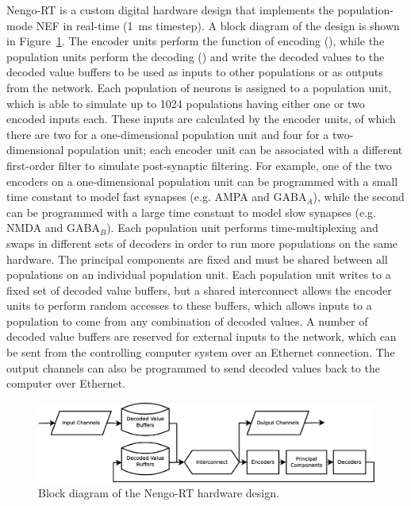 \documentclass[english]{article}
\newcommand{\design}{Nengo-RT}
\begin{document}
\design{} is a custom digital hardware design that implements the population-mode NEF in real-time (1~ms timestep).
A block diagram of the design is shown in Figure~\ref{fig:system}.
The encoder units perform the function of encoding (), %
while the population units perform the decoding () %
and write the decoded values to the decoded value buffers
to be used as inputs to other populations or as outputs from the network.
Each population of neurons is assigned to a population unit, which is able to simulate up to 1024 populations
having either one or two encoded inputs each. These inputs are calculated by the encoder units,
of which there are two for a one-dimensional population unit and four for a two-dimensional population unit;
each encoder unit can be associated with a different first-order filter to simulate post-synaptic filtering.
For example, one of the two encoders on a one-dimensional population unit can be programmed with
a small time constant to model fast synapses (e.g. AMPA and GABA$_A$), while the second can be programmed
with a large time constant to model slow synapses (e.g. NMDA and GABA$_B$).
Each population unit performs time-multiplexing and swaps in different sets of decoders
in order to run more populations on the same hardware. The principal components are fixed and must be shared
between all populations on an individual population unit.
Each population unit writes to a fixed set of decoded value buffers, but a shared interconnect
allows the encoder units to perform random accesses to these buffers, which allows
inputs to a population to come from any combination of decoded values. %
A number of decoded value buffers are reserved for external inputs to the network,
which can be sent from the controlling computer system over an Ethernet connection.
The output channels can also be programmed to send decoded values back to the computer over Ethernet.

\begin{figure}
\centering

\includegraphics[width=6in]{system-block-diagram.eps}

\caption{Block diagram of the \design{} hardware design.}

\label{fig:system}
\end{figure}
\end{document}
